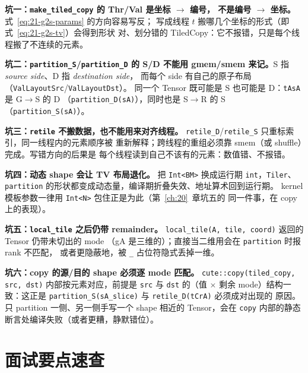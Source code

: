 \textbf{坑一：\texttt{make\_\allowbreak{}tiled\_\allowbreak{}copy} 的 Thr/Val 是坐标 $\to$ 编号，
不是编号 $\to$ 坐标。}式~\eqref{eq:21-g2s-params} 的方向容易写反；
写成线程 $t$ 搬哪几个坐标的形式（即式~\eqref{eq:21-g2s-tv}）会得到形状
对、划分错的 TiledCopy：它不报错，只是每个线程搬了不连续的元素。

\textbf{坑二：\texttt{partition\_S}/\texttt{partition\_D} 的 S/D 不能用
gmem/smem 来记。}\allowbreak{}S 指 \emph{source side}、D 指 \emph{destination side}，
而每个 side 有自己的原子布局（\texttt{Val\allowbreak{}Layout\allowbreak{}Src}/\texttt{Val\allowbreak{}Layout\allowbreak{}Dst}）。
同一个 Tensor 既可能是 S 也可能是 D：\texttt{tAsA} 是 G$\to$S 的 D
（\texttt{partition\_\allowbreak{}D\allowbreak{}(s\allowbreak{}A)}），同时也是 S$\to$R 的 S
（\texttt{partition\_\allowbreak{}S\allowbreak{}(s\allowbreak{}A)}）。

\textbf{坑三：\texttt{retile} 不搬数据，也不能用来对齐线程。}
\texttt{retile\_D}/\texttt{retile\_S} 只重标索引，同一线程内的元素顺序被
重新解释；跨线程的重组必须靠 smem（或 shuffle）完成。写错方向的后果是
每个线程读到自己不该有的元素：数值错、不报错。

\textbf{坑四：动态 shape 会让 TV 布局退化。}
把 \texttt{Int<BM>} 换成运行期 \texttt{int}，\texttt{Tiler}、
\texttt{partition} 的形状都变成动态量，编译期折叠失效、地址算术回到运行期。
kernel 模板参数一律用 \texttt{Int<N>} 包住正是为此（第~\ref{ch:20}~章坑五的
同一件事，在 copy 上的表现）。

\textbf{坑五：\texttt{local\_tile} 之后仍带 remainder。}
\texttt{local\_\allowbreak{}tile\allowbreak{}(A,\allowbreak{} tile,\allowbreak{} coord)} 返回的 Tensor 仍带未切出的 mode
（gA 是三维的）；直接当二维用会在 \texttt{partition} 时报 rank 不匹配，
或者更隐蔽地，被 \texttt{\_} 占位符隐式丢掉一维。

\textbf{坑六：copy 的源/目的 shape 必须逐 mode 匹配。}
\texttt{cute::\allowbreak{}copy\allowbreak{}(tiled\_\allowbreak{}copy,\allowbreak{} src,\allowbreak{} dst)} 内部按元素对应，前提是
\texttt{src} 与 \texttt{dst} 的（值 $\times$ 剩余 mode）结构一致：这正是
\texttt{partition\_\allowbreak{}S\allowbreak{}(s\allowbreak{}A\_\allowbreak{}slice)} 与 \texttt{retile\_\allowbreak{}D\allowbreak{}(t\allowbreak{}Cr\allowbreak{}A)} 必须成对出现的
原因。只 partition 一侧、另一侧手写一个 shape 相近的 Tensor，会在
\texttt{copy} 内部的静态断言处编译失败（或者更糟，静默错位）。

\section{面试要点速查}

